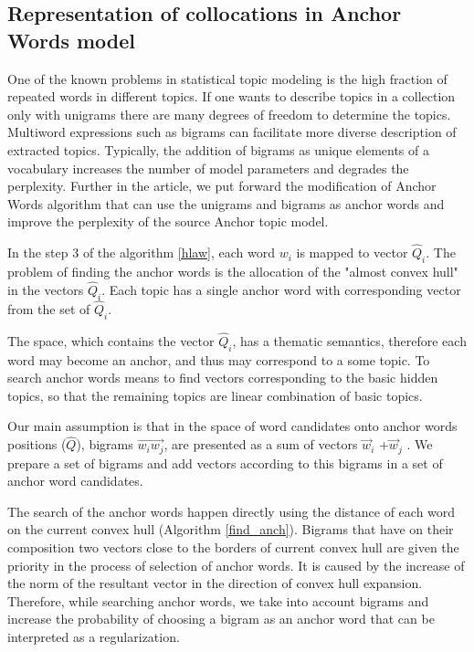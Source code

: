 \documentclass[runningheads,a4paper]{llncs}
\begin{document}
	\subsection{Representation of collocations in Anchor Words model}
	One of the known problems in statistical topic modeling is the high fraction of repeated  words in different topics. If one wants to describe topics in a collection only with unigrams there are many degrees of freedom to determine the topics. Multiword expressions such as bigrams can facilitate more diverse description of extracted topics. Typically, the addition of bigrams as unique elements of a vocabulary increases the number of model parameters and degrades the  perplexity. Further in the article, we put forward the modification of Anchor Words algorithm that can use the unigrams and bigrams as anchor words and improve the perplexity of the source Anchor topic model.
	
	In the step 3 of the algorithm \ref{hlaw}, each word  $w_i$ is mapped to vector $\hat{Q}_i$. The problem of finding the anchor words is the allocation of the "almost convex hull"\cite{arora2012practical} in the vectors $\hat{Q}_i$. Each topic has a single anchor word with corresponding vector from the set of $\hat{Q}_i$. 
    
    The space, which contains the vector $\hat{Q}_i$, has a thematic semantics, therefore each word may become an anchor, and thus may correspond to a some topic. To search anchor words means to find vectors corresponding to the basic hidden topics, so that the remaining topics are linear combination of basic topics. 
	
	Our main assumption is that in the space of word candidates onto anchor words positions ($\hat{Q}$), bigrams $\vec {w_iw_j} $, are presented as a sum of vectors $\vec{w} _i$ +$\vec{w} _j$ . We prepare a set of bigrams and add vectors according to this bigrams in a set of anchor word candidates.
	 
	The search of the anchor words happen directly using the distance of each word on the current convex hull (Algorithm \ref{find_anch}). Bigrams that have on their composition two vectors close to the borders of current convex hull are given the priority in the process of selection of anchor words. It is caused by the increase of the norm of the resultant vector in the direction of convex hull expansion. Therefore, while searching anchor words, we take into account bigrams and increase the probability of choosing a bigram as an anchor word that can be interpreted as a regularization.
	
\end{document}
